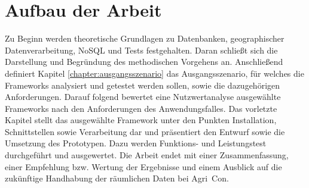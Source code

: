 \section{Aufbau der Arbeit}
Zu Beginn werden theoretische Grundlagen zu Datenbanken, geographischer Datenverarbeitung, NoSQL und Tests festgehalten.
Daran schließt sich die Darstellung und Begründung des methodischen Vorgehens an.
Anschließend definiert Kapitel \ref{chapter:ausgangsszenario} das Ausgangsszenario, für welches die Frameworks analysiert und getestet werden sollen, sowie die dazugehörigen Anforderungen.
Darauf folgend bewertet eine Nutzwertanalyse ausgewählte Frameworks nach den Anforderungen des Anwendungsfalles.
Das vorletzte Kapitel stellt das ausgewählte Framework unter den Punkten Installation, Schnittstellen sowie Verarbeitung dar und präsentiert den Entwurf sowie die Umsetzung des Prototypen.
Dazu werden Funktions- und Leistungstest durchgeführt und ausgewertet.
Die Arbeit endet mit einer Zusammenfassung, einer Empfehlung bzw. Wertung der Ergebnisse und einem Ausblick auf die zukünftige Handhabung der räumlichen Daten bei Agri~Con.